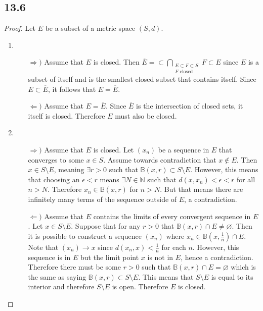 \documentclass[12pt,titlepage]{extarticle}
\begin{document}
\subsection*{13.6}
\begin{proof}
    Let $E$ be a subset of a metric space $(S,d)$.
    \begin{enumerate}
        \item
        \begin{enumerate}
            \item[$\Rightarrow)$] %
                Assume that $E$ is closed. Then $\displaystyle \overline{E} = \subset\bigcap_{\substack{E \subset F \subset S \\ F \text{ closed}}} F \subset E$ since $E$ is a subset of itself and is the smallest closed subset that contains itself. Since $E \subset \overline{E}$, it follows that $E = \overline{E}$.
            \item[$\Leftarrow)$] %
                Assume that $E = \overline{E}$. Since $\overline{E}$ is the intersection of closed sets, it itself is closed. Therefore $E$ must also be closed.
        \end{enumerate}
        \item
        \begin{enumerate}
            \item[$\Rightarrow)$] %
                Assume that $E$ is closed. Let $(x_n)$ be a sequence in $E$ that converges to some $x \in S$. Assume towards contradiction that $x \not\in E$. Then $x \in S\setminus E$, meaning $\exists r > 0$ such that $\mathbb{B}(x,r) \subset S\setminus E$. However, this means that choosing an $\epsilon < r$ means $\exists N \in \mathbb{N}$ such that $d(x, x_n) < \epsilon < r$ for all $n > N$. Therefore $x_n \in \mathbb{B}(x,r)$ for $n > N$. But that means there are infinitely many terms of the sequence outside of $E$, a contradiction.
            \item[$\Leftarrow)$] %
                Assume that $E$ contains the limits of every convergent sequence in $E$. Let $x \in S \setminus E$. Suppose that for any $r > 0$ that $\mathbb{B}(x,r) \cap E \neq \varnothing$. Then it is possible to construct a sequence $(x_n)$ where $x_n \in \mathbb{B}(x,\frac{1}{n}) \cap E$. Note that $(x_n) \to x$ since $d(x_n ,x) < \frac{1}{n}$ for each $n$. However, this sequence is in $E$ but the limit point $x$ is not in $E$, hence a contradiction. Therefore there must be some $r >0$ such that $\mathbb{B}(x,r) \cap E = \varnothing$ which is the same as saying $\mathbb{B}(x,r) \subset S \setminus E$. This means that $S \setminus E$ is equal to its interior and therefore $S \setminus E$ is open. Therefore $E$ is closed.

\end{enumerate}
\end{enumerate}
\end{proof}
\end{document}
